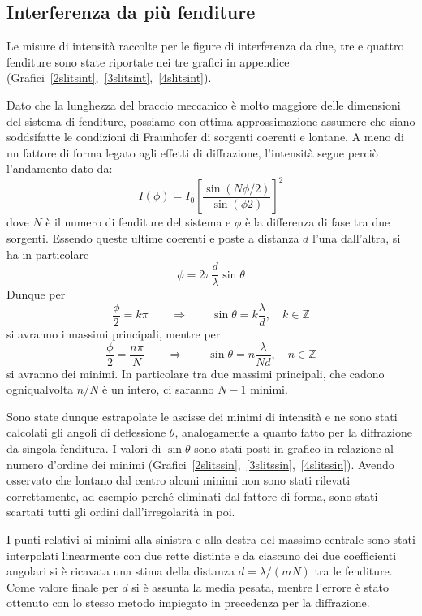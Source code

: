\documentclass[italian,a4paper]{article}
\newcommand{\Z}{\mathbb{Z}}
\begin{document}
\subsection*{Interferenza da più fenditure}
Le misure di intensità raccolte per le figure di interferenza da due, tre e quattro fenditure sono state riportate nei tre grafici in appendice (Grafici~\ref{2slitsint},~\ref{3slitsint},~\ref{4slitsint}).

Dato che la lunghezza del braccio meccanico è molto maggiore delle dimensioni del sistema di fenditure, possiamo con ottima approssimazione assumere che siano soddsifatte le condizioni di Fraunhofer di sorgenti coerenti e lontane. A meno di un fattore di forma legato agli effetti di diffrazione, l'intensità segue perciò l'andamento dato da:
\begin{equation*} 
I(\phi)=I_0\left[\dfrac{\sin\left(N\phi/2\right)}{\sin\left(\phi2\right)}\right]^2
\end{equation*}
dove $N$ è il numero di fenditure del sistema e $\phi$ è la differenza di fase tra due sorgenti. Essendo queste ultime coerenti e poste a distanza $d$ l'una dall'altra, si ha in particolare
\begin{equation*}
\phi= 2\pi \dfrac{d}{\lambda}\sin\theta 
\end{equation*}
Dunque per
\begin{equation*}
\dfrac{\phi}{2}=k\pi\qquad\Rightarrow\qquad \sin\theta= k \dfrac{\lambda}{d},\quad k \in \Z
\end{equation*}
si avranno i massimi principali, mentre per
\begin{equation*}
\dfrac{\phi}{2}=\dfrac{n\pi}{N}\qquad\Rightarrow\qquad\sin\theta=n\dfrac{\lambda}{Nd},\quad n \in \Z
\end{equation*}
si avranno dei minimi. In particolare tra due massimi principali, che cadono ogniqualvolta $n/N$ è un intero, ci saranno $N-1$ minimi.

Sono state dunque estrapolate le ascisse dei minimi di intensità e ne sono stati calcolati gli angoli di deflessione $\theta$, analogamente a quanto fatto per la diffrazione da singola fenditura.
I valori di $\sin\theta$ sono stati posti in grafico in relazione al numero d'ordine dei minimi (Grafici~\ref{2slitssin},~\ref{3slitssin},~\ref{4slitssin}).
Avendo osservato che lontano dal centro alcuni minimi non sono stati
rilevati correttamente, ad esempio perché eliminati dal fattore di forma, sono stati scartati tutti gli ordini dall'irregolarità in poi.

I punti relativi ai minimi alla sinistra e alla destra del massimo centrale sono stati interpolati linearmente con due rette distinte e da ciascuno dei due coefficienti angolari si è ricavata una stima della distanza $d=\lambda/(mN)$ tra le fenditure.
Come valore finale per $d$ si è assunta la media pesata, mentre l'errore è stato ottenuto con lo stesso metodo impiegato in precedenza per la diffrazione.
\end{document}
